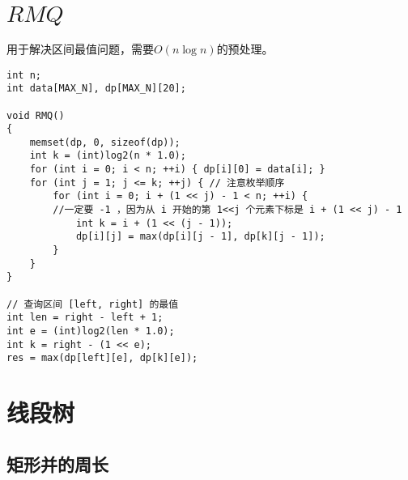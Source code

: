\clearpage
\section{$RMQ$}

用于解决区间最值问题，需要$O(n\log n)$的预处理。
\begin{lstlisting}
int n;
int data[MAX_N], dp[MAX_N][20];

void RMQ()
{
	memset(dp, 0, sizeof(dp));
	int k = (int)log2(n * 1.0);
	for (int i = 0; i < n; ++i) { dp[i][0] = data[i]; }
	for (int j = 1; j <= k; ++j) { // 注意枚举顺序
		for (int i = 0; i + (1 << j) - 1 < n; ++i) {
		//一定要 -1 ，因为从 i 开始的第 1<<j 个元素下标是 i + (1 << j) - 1
			int k = i + (1 << (j - 1));
			dp[i][j] = max(dp[i][j - 1], dp[k][j - 1]);
		}
	}
}

// 查询区间 [left, right] 的最值
int len = right - left + 1;
int e = (int)log2(len * 1.0);
int k = right - (1 << e);
res = max(dp[left][e], dp[k][e]);
\end{lstlisting}

\clearpage
\section{线段树}

\subsection{矩形并的周长}

